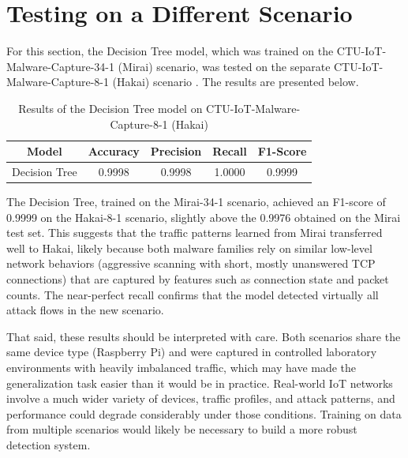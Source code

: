 \documentclass{article}
\begin{document}
\section{Testing on a Different Scenario}

For this section, the Decision Tree model, which was trained on the
CTU-IoT-Malware-Capture-34-1 (Mirai) scenario, was tested on the separate
CTU-IoT-Malware-Capture-8-1 (Hakai) scenario \cite{iot23scenarioguide}. The results are presented below.

\begin{table}[h]
    \centering
    \begin{tabular}{|c|c|c|c|c|}
     \hline
     Model & Accuracy & Precision & Recall & F1-Score \\
     \hline
     Decision Tree & 0.9998 & 0.9998 & 1.0000 & 0.9999 \\
     \hline
    \end{tabular}
    \caption{Results of the Decision Tree model on CTU-IoT-Malware-Capture-8-1 (Hakai)}
    \label{tab:Results_unknown}
\end{table}

The Decision Tree, trained on the Mirai-34-1 scenario, achieved an F1-score of 0.9999 on the Hakai-8-1 scenario, slightly above the 0.9976 obtained on the Mirai test set. This suggests that the traffic patterns learned from Mirai transferred well to Hakai, likely because both malware families rely on similar low-level network behaviors (aggressive scanning with short, mostly unanswered TCP connections) that are captured by features such as connection state and packet counts. The near-perfect recall confirms that the model detected virtually all attack flows in the new scenario.

That said, these results should be interpreted with care. Both scenarios share the same device type (Raspberry Pi) and were captured in controlled laboratory environments with heavily imbalanced traffic, which may have made the generalization task easier than it would be in practice. Real-world IoT networks involve a much wider variety of devices, traffic profiles, and attack patterns, and performance could degrade considerably under those conditions. Training on data from multiple scenarios would likely be necessary to build a more robust detection system.



\end{document}
